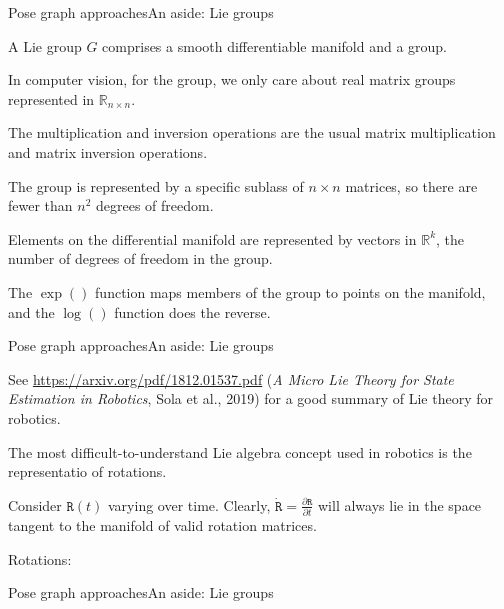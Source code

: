 \documentclass[aspectratio=169]{beamer}
\newcommand{\mat}[1]{\mathtt{#1}}
\def\Rset{\mathbb{R}}
\newcommand{\lse}{\mathfrak{se}}
\newcommand{\lso}{\mathfrak{so}}
\newcommand{\myfig}[3]{\centerline{\texttt{[image: \#2]}}
    \centerline{\scriptsize \begin{minipage}{#1} \centering #3 \end{minipage}}}
\begin{document}
\begin{frame}{Pose graph approaches}{An aside: Lie groups}

A Lie group $G$ comprises a smooth differentiable manifold and a group.

\medskip

In computer vision, for the group, we only care about real matrix groups
represented in $\Rset_{n\times n}$.

\medskip

The multiplication and inversion operations are the usual matrix multiplication
and matrix inversion operations.

\medskip

The group is represented by a specific sublass of $n\times n$ matrices, so
there are fewer than $n^2$ degrees of freedom.

\medskip

Elements on the differential manifold are represented by vectors in $\Rset^k$,
the number of degrees of freedom in the group.

\medskip

The $\exp()$ function maps members of the group to points on the manifold,
and the $\log()$ function does the reverse.

\end{frame}


\begin{frame}{Pose graph approaches}{An aside: Lie groups}

  See \url{https://arxiv.org/pdf/1812.01537.pdf} (\textit{A Micro Lie
    Theory for State Estimation in Robotics}, Sola et al., 2019) for a
  good summary of Lie theory for robotics.

  \medskip
  
  The most difficult-to-understand Lie algebra concept used in
  robotics is the representatio of rotations.

  \medskip

  Consider $\mat{R}(t)$ varying over time.  Clearly, $\dot{\mat{R}} =
  \frac{\partial \mat{R}}{\partial t}$ will always lie in the space
  \alert{tangent} to the manifold of valid rotation matrices.
  
  \medskip

  Rotations: 

\end{frame}


\begin{frame}{Pose graph approaches}{An aside: Lie groups}


\end{frame}
\end{document}
